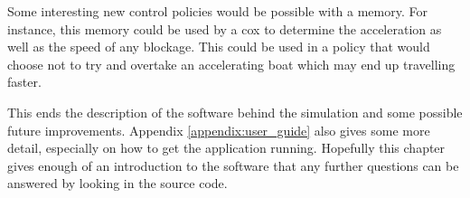 Some interesting new control policies would be possible with a memory. For instance, this memory could be used by a cox to determine the acceleration as well as the speed of any blockage. This could be used in a policy that would choose not to try and overtake an accelerating boat which may end up travelling faster.


This ends the description of the software behind the simulation and some possible future improvements. Appendix \ref{appendix:user_guide} also gives some more detail, especially on how to get the application running. Hopefully this chapter gives enough of an introduction to the software that any further questions can be answered by looking in the source code.
